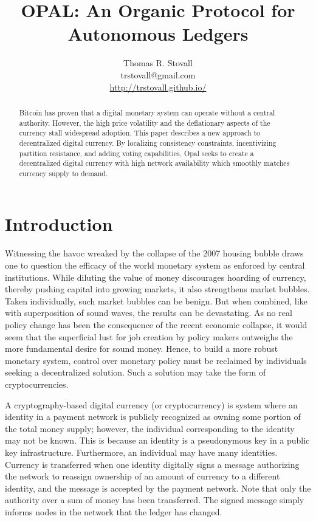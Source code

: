 \documentclass[10pt,twocolumn]{article}
\begin{document}
\title{OPAL: An Organic Protocol for Autonomous Ledgers}
\author{Thomas R. Stovall \\
trstovall@gmail.com \\
\url{http://trstovall.github.io/}}

\maketitle

\begin{abstract}
Bitcoin has proven that a digital monetary system can operate without a central authority.  However, the high price volatility and the deflationary aspects of the currency stall widespread adoption.  This paper describes a new approach to decentralized digital currency.  By localizing consistency constraints, incentivizing partition resistance, and adding voting capabilities, Opal seeks to create a decentralized digital currency with high network availability which smoothly matches currency supply to demand.
\end{abstract}

\section{Introduction}
Witnessing the havoc wreaked by the collapse of the 2007 housing bubble draws one to question the efficacy of the world monetary system as enforced by central institutions.  While diluting the value of money discourages hoarding of currency, thereby pushing capital into growing markets, it also strengthens market bubbles.  Taken individually, such market bubbles can be benign.  But when combined, like with superposition of sound waves, the results can be devastating.  As no real policy change has been the consequence of the recent economic collapse, it would seem that the superficial lust for job creation by policy makers outweighs the more fundamental desire for sound money.  Hence, to build a more robust monetary system, control over monetary policy must be reclaimed by individuals seeking a decentralized solution.  Such a solution may take the form of cryptocurrencies.

A cryptography-based digital currency (or cryptocurrency) is system where an identity in a payment network is publicly recognized as owning some portion of the total money supply; however, the individual corresponding to the identity may not be known.  This is because an identity is a pseudonymous key in a public key infrastructure.  Furthermore, an individual may have many identities.  Currency is transferred when one identity digitally signs a message authorizing the network to reassign ownership of an amount of currency to a different identity, and the message is accepted by the payment network.  Note that only the authority over a sum of money has been transferred.  The signed message simply informs nodes in the network that the ledger has changed.
\end{document}
